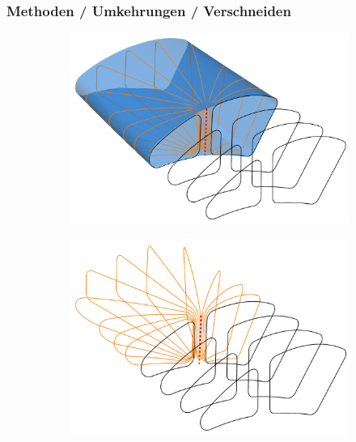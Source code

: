 \documentclass[8pt, aspectratio=169]{beamer}
\begin{document}
\begin{frame}
	\frametitle{Methoden / Umkehrungen / Verschneiden}
	\vspace{-1cm}\hspace{-0.5cm}
	\begin{figure}
		\centering
		\begin{subfigure}{.49\textwidth}
			\includegraphics[width=\textwidth]{../tec/turn/11.png}
		\end{subfigure}
		\begin{subfigure}{.49\textwidth}
			\includegraphics[width=\textwidth]{../tec/turn/10.png}
		\end{subfigure}
	\end{figure}
\end{frame}
\end{document}
